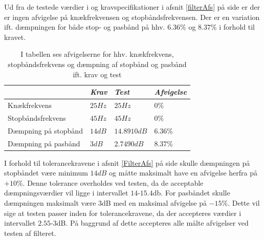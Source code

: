 Ud fra de testede værdier i  og kravspecifikationer i afsnit \ref{filterAfs} på side \pageref{filterAfs} er der er ingen afvigelse på knækfrekvensen og stopbåndsfrekvensen. Der er en variation ift. dæmpningen for både stop- og pasbånd på hhv. $6.36\%$ og $8.37$\% i forhold til kravet.

\begin{table}[H]
	\centering
	\begin{tabular}{|l|l|l|l|}
		\hline
   & \textit{Krav} 	& \textit{Test}  &\textit{Afvigelse} \\ \hline
Knækfrekvens	 & $25Hz$ 			& $25Hz$			& $0\%$  \\ \hline
Stopbåndsfrekvens & $45Hz$		& $45Hz$			& $0\%$ \\ \hline
Dæmpning på stopbånd & $14dB$    & $14.8910dB$    & $6.36\%$  \\ \hline
Dæmpning på pasbånd & $3dB$		& $2.7490dB$	    & $8.37\%$ \\ \hline
	\end{tabular}
	\caption{I tabellen ses afvigelserne for hhv. knækfrekvens, stopbåndsfrekvens og dæmpning af stopbånd og pasbånd ift. krav og test}
	\label{Tab:Tolerance}
\end{table}
\noindent I forhold til tolerancekravene i afsnit \ref{FilterAfs} på side \pageref{FilterAfs} skulle dæmpningen på stopbåndet være minimum $14 dB$ og måtte maksimalt have en afvigelse herfra på $+10\%$. Denne tolerance overholdes ved testen, da de acceptable dæmpningsværdier vil ligge i intervallet $14$-$15.4$db. For pasbåndet skulle dæmpningen maksimalt være $3$dB med en maksimal afvigelse på $-15\%$. Dette vil sige at testen passer inden for tolerancekravene, da der accepteres værdier i intervallet $2.55$-$3$dB. På baggrund af dette accepteres alle målte afvigelser ved testen af filteret.